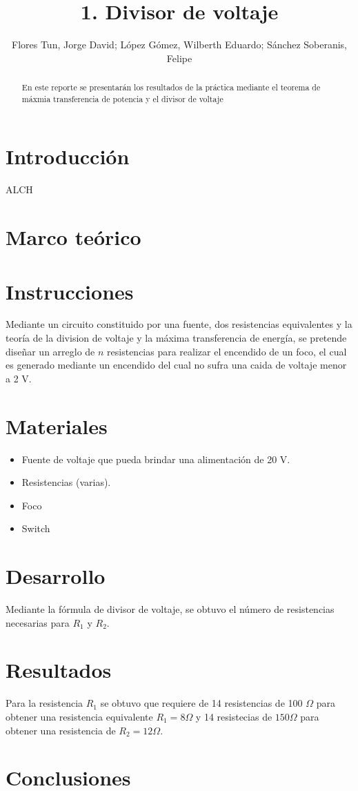 \documentclass[]{article}
\title{1. Divisor de voltaje}
\author{Flores Tun, Jorge David; López Gómez, Wilberth Eduardo; Sánchez Soberanis, Felipe}
\begin{document}
\maketitle

\begin{abstract}
    En este reporte se presentarán los resultados de la práctica mediante el teorema de máxmia transferencia de potencia y el divisor de voltaje
\end{abstract}

\section{Introducción}

ALCH 

\section{Marco teórico}



\section{Instrucciones}

Mediante un circuito constituido por una fuente, dos resistencias equivalentes y
la teoría de la division de voltaje y la máxima transferencia de energía, se
pretende diseñar un arreglo de $n$ resistencias para realizar el encendido de
un foco, el cual es generado mediante un encendido del cual no sufra una caida
de voltaje menor a 2 V.

\section{Materiales}

\begin{itemize}
    \item Fuente de voltaje que pueda brindar una alimentación de 20 V.
    \item Resistencias (varias).
    \item Foco
    \item Switch
    \end{itemize}


\section{Desarrollo}


Mediante la fórmula de divisor de voltaje, se obtuvo el número de resistencias
necesarias para $R_1$ y $R_2$.

\section{Resultados}

Para la resistencia $R_1$ se obtuvo que requiere de 14 resistencias de 100
$\Omega$ para obtener una resistencia equivalente $R_1 = 8 \Omega$ y 14 resistecias
de $150 \Omega$ para obtener una resistencia de $R_2 = 12 \Omega$.


\section{Conclusiones}


\end{document}

